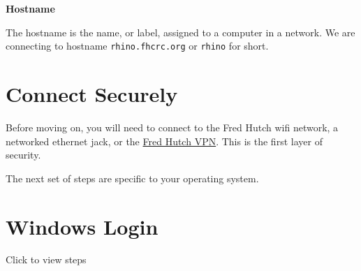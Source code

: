 \documentclass[
]{book}
\begin{document}
\textbf{Hostname}

The hostname is the name, or label, assigned to a computer in a network. We are connecting to hostname \texttt{rhino.fhcrc.org} or \texttt{rhino} for short.

\hypertarget{connect-securely}{%
\section{Connect Securely}\label{connect-securely}}

Before moving on, you will need to connect to the Fred Hutch wifi network, a networked ethernet jack, or the \href{https://centernet.fredhutch.org/cn/u/center-it/help-desk/vpn.html}{Fred Hutch VPN}. This is the first layer of security.

The next set of steps are specific to your operating system.

\hypertarget{windows-login}{%
\section{Windows Login}\label{windows-login}}

Click to view steps
\end{document}
